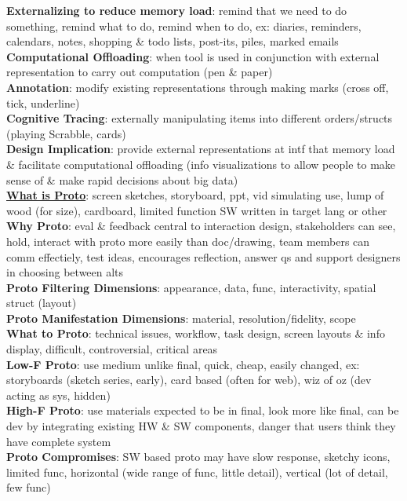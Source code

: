 \documentclass[a4paper]{article}
\begin{document}
\begin{multicols}{3}
        \textbf{Externalizing to reduce memory load}: remind that we need to do something, remind what to do, remind when to do, ex: diaries, reminders, calendars, notes, shopping \& todo lists, post-its, piles, marked emails\\
        \textbf{Computational Offloading}: when tool is used in conjunction with external representation to carry out computation (pen \& paper)\\
        \textbf{Annotation}: modify existing representations through making marks (cross off, tick, underline)\\
        \textbf{Cognitive Tracing}: externally manipulating items into different orders/structs (playing Scrabble, cards)\\
        \textbf{Design Implication}: provide external representations at intf that memory load \& facilitate computational offloading (info visualizations to allow people to make sense of \& make rapid decisions about big data)\\
        \underline{\textbf{What is Proto}}: screen sketches, storyboard, ppt, vid simulating use, lump of wood (for size), cardboard, limited function SW written in target lang or other\\
        \textbf{Why Proto}: eval \& feedback central to interaction design, stakeholders can see, hold, interact with proto more easily than doc/drawing, team members can comm effectiely, test ideas, encourages reflection, answer qs and support designers in choosing between alts\\
        \textbf{Proto Filtering Dimensions}: appearance, data, func, interactivity, spatial struct (layout)\\
        \textbf{Proto Manifestation Dimensions}: material, resolution/fidelity, scope\\
        \textbf{What to Proto}: technical issues, workflow, task design, screen layouts \& info display, difficult, controversial, critical areas\\
        \textbf{Low-F Proto}: use medium unlike final, quick, cheap, easily changed, ex: storyboards (sketch series, early), card based (often for web), wiz of oz (dev acting as sys, hidden)\\
        \textbf{High-F Proto}: use materials expected to be in final, look more like final, can be dev by integrating existing HW \& SW components, danger that users think they have complete system\\
        \textbf{Proto Compromises}: SW based proto may have slow response, sketchy icons, limited func, horizontal (wide range of func, little detail), vertical (lot of detail, few func)\\

\end{multicols}
\end{document}
